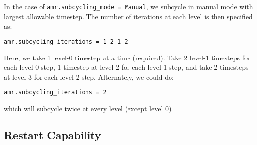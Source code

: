 In the case of {\tt amr.subcycling\_mode = Manual},
we subcycle in manual mode with largest allowable timestep.  The
number of iterations at each level is then specified as:
\begin{lstlisting}
amr.subcycling_iterations = 1 2 1 2
\end{lstlisting}
Here, we take 1 level-0 timestep at a time (required). Take 2 level-1
timesteps for each level-0 step, 1 timestep at level-2 for each
level-1 step, and take 2 timesteps at level-3 for each level-2 step.
Alternately, we could do:
\begin{lstlisting}
amr.subcycling_iterations = 2
\end{lstlisting}
which will subcycle twice at every level (except level 0).


\subsection{Restart Capability}

